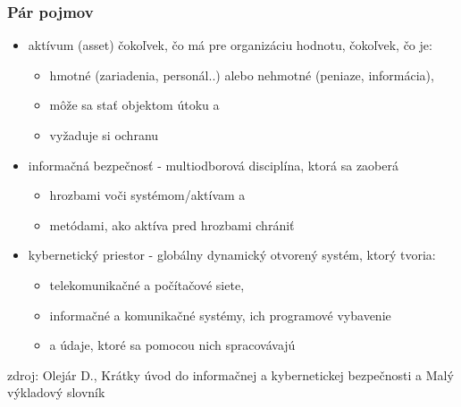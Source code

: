 \documentclass{beamer}
\begin{document}
\begin{frame}
    \frametitle{Pár pojmov}
    \begin{itemize}
        \item aktívum (asset)
            čokoľvek, čo má pre organizáciu hodnotu, čokoľvek, čo je:
            \begin{itemize}
                \item hmotné (zariadenia, personál..) alebo nehmotné (peniaze, informácia),
                \item môže sa stať objektom útoku a
                \item vyžaduje si ochranu
            \end{itemize}
        \item informačná bezpečnosť - 
            multiodborová disciplína, ktorá sa zaoberá
            \begin{itemize}
                \item hrozbami voči systémom/aktívam a
                \item metódami, ako aktíva pred hrozbami chrániť
            \end{itemize}
        \item kybernetický priestor -
            globálny dynamický otvorený systém, ktorý tvoria:
            \begin{itemize}
                \item telekomunikačné a počítačové siete,
                \item informačné a komunikačné systémy, ich programové vybavenie 
                \item a údaje, ktoré sa pomocou nich spracovávajú
            \end{itemize}
    \end{itemize}
    zdroj: Olejár D., Krátky úvod do informačnej a kybernetickej bezpečnosti a Malý výkladový slovník
\end{frame}
\end{document}
